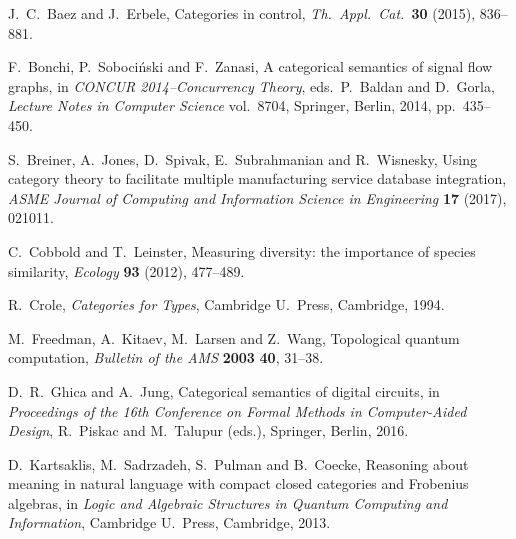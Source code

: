 \documentclass[12pt]{amsart}
\begin{document}
\begin{thebibliography}{10}
 J.\ C.\ Baez and J.\ Erbele, Categories in control,  \textsl{Th.\ Appl.\ Cat.\ }\textbf{30} (2015), 836--881.   %

 F.\ Bonchi, P.\ Soboci\'nski and F.\ Zanasi, A categorical semantics of signal flow graphs, in \textsl{CONCUR 2014--Concurrency Theory}, eds.\ P.\ Baldan and D.\ Gorla, \textsl{Lecture Notes in Computer Science} vol.\ 8704, Springer, Berlin, 2014, pp.\ 435--450.  %

 S.\ Breiner, A.\ Jones, D.\ Spivak, E.\ Subrahmanian and R.\ Wisnesky, Using category theory to facilitate multiple manufacturing service database integration, \textsl{ASME Journal of Computing and Information Science in Engineering} \textbf{17} (2017), 021011.  %

 C.\ Cobbold and T.\ Leinster, Measuring diversity: the importance of species similarity, \textsl{Ecology} \textbf{93} (2012), 477--489.  %

 R.\ Crole, \textsl{Categories for Types}, Cambridge U.\ Press, Cambridge, 1994.

 M.\ Freedman, A.\ Kitaev, M.\ Larsen and Z.\ Wang, Topological quantum computation, \textsl{Bulletin of the AMS} \textbf{2003} \textbf{40}, 31–38.  %

  D.\ R.\ Ghica and A.\ Jung, Categorical semantics of digital circuits, in \textsl{Proceedings of the 16th Conference on Formal Methods in Computer-Aided Design}, 
R.\ Piskac and M.\ Talupur (eds.), Springer, Berlin, 2016.  %

  D.\ Kartsaklis, M.\ Sadrzadeh, S.\ Pulman and B.\ Coecke, Reasoning about meaning in natural language with compact closed categories and Frobenius algebras, in \textsl{Logic and Algebraic Structures in Quantum Computing and Information}, Cambridge U.\ Press, Cambridge, 2013.   %


\end{thebibliography}
\end{document}
